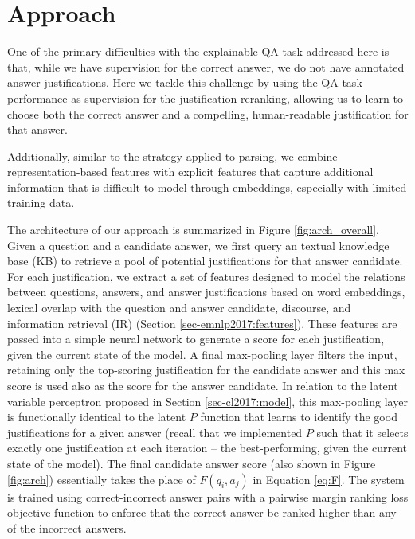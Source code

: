 \section{Approach}
\label{sec-emnlp2017:approach}
One of the primary difficulties with the explainable QA task addressed here is that, while we have supervision for the correct answer, we do not have annotated answer justifications.  
Here we tackle this challenge by using the QA task performance as supervision for the justification reranking, allowing us to 
learn to choose both the correct answer and a compelling, human-readable justification for that answer.

Additionally, similar to the strategy \citet{chen2014fast} applied to parsing, we combine representation-based features with explicit features that capture additional information that is difficult to model through embeddings, especially with limited training data.


The architecture of our approach is summarized in Figure \ref{fig:arch_overall}.  
Given a question and a candidate answer, we first query an textual knowledge base (KB) to retrieve a pool of potential justifications for that answer candidate.  
For each justification, we extract a set of features designed to model the relations between questions, answers, and answer justifications based on word embeddings, lexical overlap with the question and answer candidate, discourse, and information retrieval (IR) (Section \ref{sec-emnlp2017:features}).
These features are passed into a simple neural network to generate a score for each justification, given the current state of the model.  A final max-pooling layer filters the input, retaining only the top-scoring justification for the candidate answer and this max score is used also as the score for the answer candidate.  In relation to the latent variable perceptron proposed in Section \ref{sec-cl2017:model}, this max-pooling layer is functionally identical to the latent $P$ function that learns to identify the good justifications for a given answer (recall that we implemented $P$ such that it selects exactly one justification at each iteration -- the best-performing, given the current state of the model).
The final candidate answer score (also shown in Figure \ref{fig:arch}) essentially takes the place of $F(q_i, a_j)$ in Equation \ref{eq:F}.     
The system is trained using correct-incorrect answer pairs with a pairwise margin ranking loss objective function to enforce that the correct answer be ranked higher than any of the incorrect answers. 

